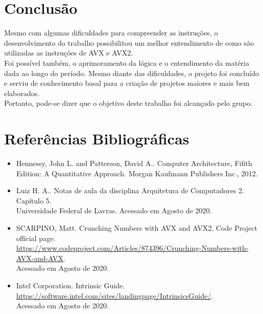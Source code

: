 \documentclass[oneside,a4paper,12pt]{article}
\begin{document}
\section{Conclusão}
Mesmo com algumas dificuldades para compreender as instruções, o desenvolvimento do trabalho possibilitou um melhor entendimento de como são utilizadas as instruções de AVX e AVX2.\\
\indent
Foi possível também, o aprimoramento da lógica e o entendimento da matéria dada ao longo do período. Mesmo diante das dificuldades, o projeto foi concluído e serviu de conhecimento basal para a criação de projetos maiores e mais bem elaborados. \\
\indent
Portanto, pode-se dizer que o objetivo deste trabalho foi alcançado pelo grupo.


\section{Referências Bibliográficas}

\begin{itemize}
    \item Hennessy, John L. and Patterson, David A.. Computer Architecture, Fifith Edition: A Quantitative Approach. Morgan Kaufmann Publishers Inc., 2012.
    
    \item Luiz H. A.. Notas de aula da disciplina Arquitetura de Computadores 2. Capítulo 5.\\
    Universidade Federal de Lavras. Acessado em Agosto de 2020.

    \item SCARPINO, Matt. Crunching Numbers with AVX and AVX2. Code Project official page.\\
    \url{https://www.codeproject.com/Articles/874396/Crunching-Numbers-with-AVX-and-AVX}.\\
    Acessado em Agosto de 2020.

    \item Intel Corporation. Intrinsic Guide.\\
    \url{https://software.intel.com/sites/landingpage/IntrinsicsGuide/}. \\
    Acessado em Agosto de 2020.

\end{itemize}
\end{document}
